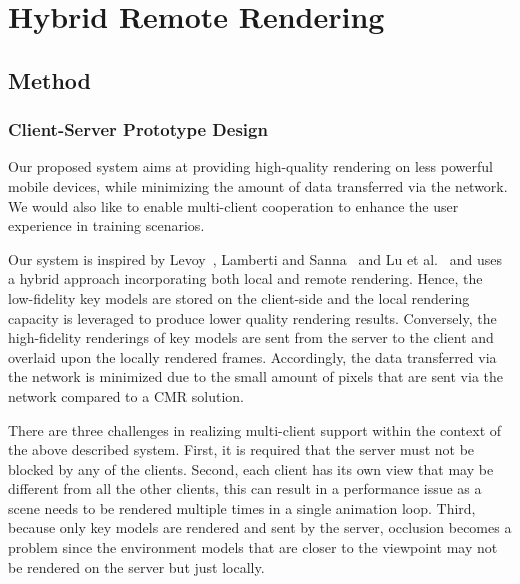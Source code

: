 \chapter{Hybrid Remote Rendering}
\label{chap:hrr}

\section{Method}
\label{sec:method}

\subsection{Client-Server Prototype Design}
\label{sec:method:cspd}

Our proposed system aims at providing high-quality rendering on less powerful mobile devices, while minimizing the amount of data transferred via the network. We would also like to enable multi-client cooperation to enhance the user experience in training scenarios.

Our system is inspired by Levoy~\cite{levoy1995}, Lamberti and Sanna~\cite{lamberti2007} and Lu et al.~\cite{lu2011} and uses a hybrid approach incorporating both local and remote rendering.
Hence, the low-fidelity key models are stored on the client-side and the local rendering capacity is leveraged to produce lower quality rendering results.
Conversely, the high-fidelity renderings of key models are sent from the server to the client and overlaid upon the locally rendered frames.
Accordingly, the data transferred via the network is minimized due to the small amount of pixels that are sent via the network compared to a CMR solution. 

There are three challenges in realizing multi-client support within the context of the above described system.
First, it is required that the server must not be blocked by any of the clients.
Second, each client has its own view that may be different from all the other clients, this can result in a performance issue as a scene needs to be rendered multiple times in a single animation loop.
Third, because only key models are rendered and sent by the server, occlusion becomes a problem since the environment models that are closer to the viewpoint may not be rendered on the server but just locally.

